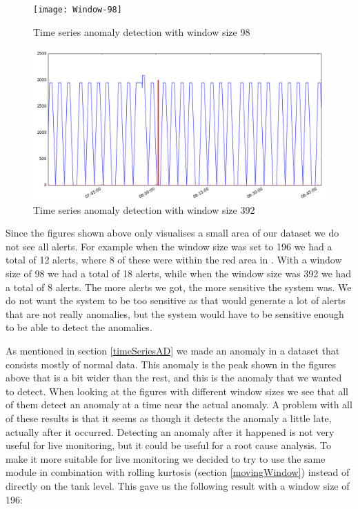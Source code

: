 \documentclass[english, a4paper]{report}
\begin{document}
{{{            \begin{figure}[H]
                \centering
                \texttt{[image: Window-98]}
                \caption{Time series anomaly detection with window size 98}
                \label{fig:timeSeriesADWindow98}
            \end{figure}
            
            \begin{figure}[H]
                \centering
                \includegraphics[width=\textwidth]{Window-392}
                \caption{Time series anomaly detection with window size 392}
                \label{fig:timeSeriesADWindow392}
            \end{figure}
            
            Since the figures shown above only visualises a small area of our dataset we do not see all alerts. For example when the window size was set to 196 we had a total of 12 alerts, where 8 of these were within the red area in . With a window size of 98 we had a total of 18 alerts, while when the window size was 392 we had a total of 8 alerts. The more alerts we got, the more sensitive the system was. We do not want the system to be too sensitive as that would generate a lot of alerts that are not really anomalies, but the system would have to be sensitive enough to be able to detect the anomalies.
            
            As mentioned in section \ref{timeSeriesAD} we made an anomaly in a dataset that consists mostly of normal data. This anomaly is the peak shown in the figures above that is a bit wider than the rest, and this is the anomaly that we wanted to detect. When looking at the figures with different window sizes we see that all of them detect an anomaly at a time near the actual anomaly. A problem with all of these results is that it seems as though it detects the anomaly a little late, actually after it occurred. Detecting an anomaly after it happened is not very useful for live monitoring, but it could be useful for a root cause analysis. To make it more suitable for live monitoring we decided to try to use the same module in combination with rolling kurtosis (section \ref{movingWindow}) instead of directly on the tank level. This gave us the following result with a window size of 196: 
            
}}}
\end{document}
